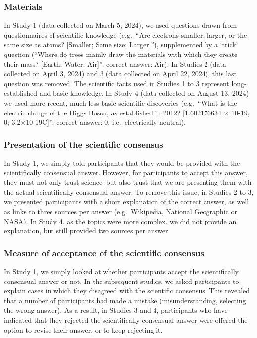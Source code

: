 \documentclass[
  doc,floatsintext]{apa6}
\begin{document}
\subsubsection{Materials}\label{materials}

In Study 1 (data collected on March 5, 2024), we used questions drawn from questionnaires of scientific knowledge (e.g.~``Are electrons smaller, larger, or the same size as atoms? {[}Smaller; Same size; Larger{]}''), supplemented by a `trick' question (``Where do trees mainly draw the materials with which they create their mass? {[}Earth; Water; Air{]}''; correct answer: Air). In Studies 2 (data collected on April 3, 2024) and 3 (data collected on April 22, 2024), this last question was removed. The scientific facts used in Studies 1 to 3 represent long-established and basic knowledge. In Study 4 (data collected on August 13, 2024) we used more recent, much less basic scientific discoveries (e.g.~``What is the electric charge of the Higgs Boson, as established in 2012? {[}1.602176634 × 10-19; 0; 3.2×10-19C{]}''; correct answer: 0, i.e.~electrically neutral).

\subsubsection{Presentation of the scientific consensus}\label{presentation-of-the-scientific-consensus}

In Study 1, we simply told participants that they would be provided with the scientifically consensual answer. However, for participants to accept this answer, they must not only trust science, but also trust that we are presenting them with the actual scientifically consensual answer. To remove this issue, in Studies 2 to 3, we presented participants with a short explanation of the correct answer, as well as links to three sources per answer (e.g.~Wikipedia, National Geographic or NASA). In Study 4, as the topics were more complex, we did not provide an explanation, but still provided two sources per answer.

\subsubsection{Measure of acceptance of the scientific consensus}\label{measure-of-acceptance-of-the-scientific-consensus}

In Study 1, we simply looked at whether participants accept the scientifically consensual answer or not. In the subsequent studies, we asked participants to explain cases in which they disagreed with the scientific consensus. This revealed that a number of participants had made a mistake (misunderstanding, selecting the wrong answer). As a result, in Studies 3 and 4, participants who have indicated that they rejected the scientifically consensual answer were offered the option to revise their answer, or to keep rejecting it.
\end{document}
